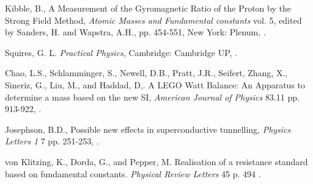 \documentclass[twoside]{article}
\begin{document}
\begin{thebibliography}{99} %

Kibble, B.,
\newblock A Measurement of the Gyromagnetic Ratio of the Proton by the
Strong Field Method,
\newblock \textit{Atomic Masses and Fundamental constants} vol. 5,
edited by Sanders, H. and Wapstra, A.H., pp. 454-551,
\newblock New York: Plenum,
.

 Squires, G. L.  
 \newblock \textit{Practical Physics},
 \newblock Cambridge: Cambridge UP, 
 .

Chao, L.S., Schlamminger, S., Newell, D.B., Pratt, J.R., Seifert,
Zhang, X., Sineriz, G., Liu, M., and Haddad, D,.
\newblock A LEGO Watt Balance: An Apparatus to determine a mass based
on the new SI,
\newblock \textit{American Journal of Physics} 83.11 pp. 913-922,
.

Josephson, B.D.,
\newblock Possible new effects in superconductive tunnelling,
\newblock \textit{Physics Letters 1} 7 pp. 251-253,
.

von Klitzing, K., Dorda, G., and Pepper, M.
\newblock Realisation of a resistance standard based on fundamental constants.
\newblock \textit{Physical Review Letters} 45 p. 494
.

\end{thebibliography}
\end{document}
